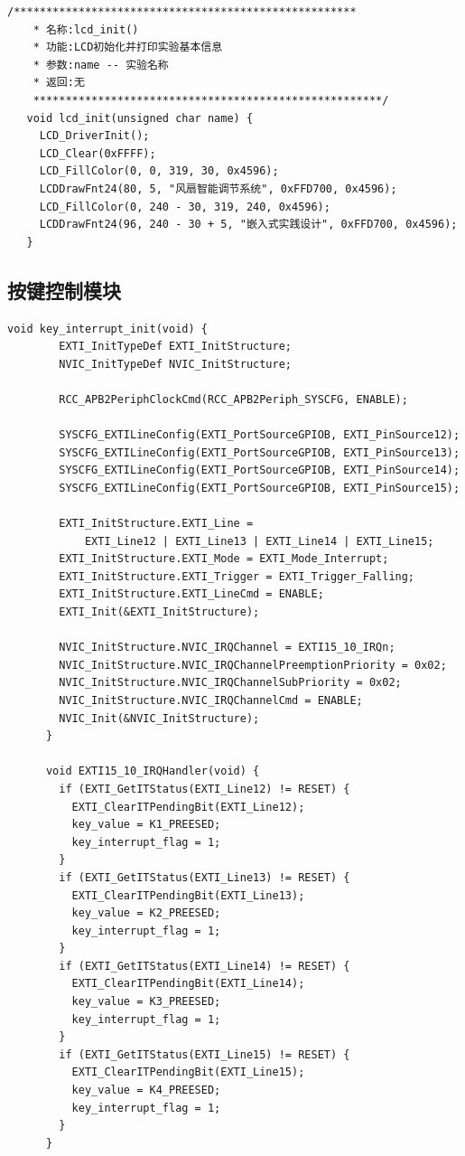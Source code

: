 \begin{lstlisting}[caption={实验标题显示}]
    /*****************************************************
    * 名称:lcd_init()
    * 功能:LCD初始化并打印实验基本信息
    * 参数:name -- 实验名称
    * 返回:无
    ******************************************************/
   void lcd_init(unsigned char name) {
     LCD_DriverInit();
     LCD_Clear(0xFFFF);
     LCD_FillColor(0, 0, 319, 30, 0x4596);
     LCDDrawFnt24(80, 5, "风扇智能调节系统", 0xFFD700, 0x4596);
     LCD_FillColor(0, 240 - 30, 319, 240, 0x4596);
     LCDDrawFnt24(96, 240 - 30 + 5, "嵌入式实践设计", 0xFFD700, 0x4596);
   }
\end{lstlisting}

\subsection{按键控制模块}

\begin{lstlisting}[caption={按键中断初始化}]
    void key_interrupt_init(void) {
        EXTI_InitTypeDef EXTI_InitStructure;
        NVIC_InitTypeDef NVIC_InitStructure;

        RCC_APB2PeriphClockCmd(RCC_APB2Periph_SYSCFG, ENABLE);

        SYSCFG_EXTILineConfig(EXTI_PortSourceGPIOB, EXTI_PinSource12);
        SYSCFG_EXTILineConfig(EXTI_PortSourceGPIOB, EXTI_PinSource13);
        SYSCFG_EXTILineConfig(EXTI_PortSourceGPIOB, EXTI_PinSource14);
        SYSCFG_EXTILineConfig(EXTI_PortSourceGPIOB, EXTI_PinSource15);

        EXTI_InitStructure.EXTI_Line =
            EXTI_Line12 | EXTI_Line13 | EXTI_Line14 | EXTI_Line15;
        EXTI_InitStructure.EXTI_Mode = EXTI_Mode_Interrupt;
        EXTI_InitStructure.EXTI_Trigger = EXTI_Trigger_Falling;
        EXTI_InitStructure.EXTI_LineCmd = ENABLE;
        EXTI_Init(&EXTI_InitStructure);

        NVIC_InitStructure.NVIC_IRQChannel = EXTI15_10_IRQn;
        NVIC_InitStructure.NVIC_IRQChannelPreemptionPriority = 0x02;
        NVIC_InitStructure.NVIC_IRQChannelSubPriority = 0x02;
        NVIC_InitStructure.NVIC_IRQChannelCmd = ENABLE;
        NVIC_Init(&NVIC_InitStructure);
      }

      void EXTI15_10_IRQHandler(void) {
        if (EXTI_GetITStatus(EXTI_Line12) != RESET) {
          EXTI_ClearITPendingBit(EXTI_Line12);
          key_value = K1_PREESED;
          key_interrupt_flag = 1;
        }
        if (EXTI_GetITStatus(EXTI_Line13) != RESET) {
          EXTI_ClearITPendingBit(EXTI_Line13);
          key_value = K2_PREESED;
          key_interrupt_flag = 1;
        }
        if (EXTI_GetITStatus(EXTI_Line14) != RESET) {
          EXTI_ClearITPendingBit(EXTI_Line14);
          key_value = K3_PREESED;
          key_interrupt_flag = 1;
        }
        if (EXTI_GetITStatus(EXTI_Line15) != RESET) {
          EXTI_ClearITPendingBit(EXTI_Line15);
          key_value = K4_PREESED;
          key_interrupt_flag = 1;
        }
      }
\end{lstlisting}

